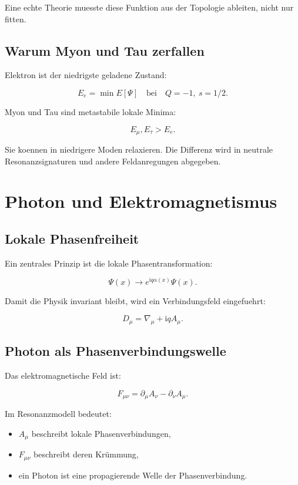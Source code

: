 \documentclass[11pt,a4paper]{article}
\newcommand{\ii}{\mathrm{i}}
\begin{document}
Eine echte Theorie muesste diese Funktion aus der Topologie ableiten, nicht nur fitten.

\subsection{Warum Myon und Tau zerfallen}

Elektron ist der niedrigste geladene Zustand:

\[
E_e = \min E[\Psi]\quad\text{bei}\quad Q=-1,\ s=1/2.
\]

Myon und Tau sind metastabile lokale Minima:

\[
E_\mu,E_\tau > E_e.
\]

Sie koennen in niedrigere Moden relaxieren. Die Differenz wird in neutrale Resonanzsignaturen und andere
Feldanregungen abgegeben.

\section{Photon und Elektromagnetismus}

\subsection{Lokale Phasenfreiheit}

Ein zentrales Prinzip ist die lokale Phasentransformation:

\[
\Psi(x)\rightarrow e^{\ii q\alpha(x)}\Psi(x).
\]

Damit die Physik invariant bleibt, wird ein Verbindungsfeld eingefuehrt:

\[
D_\mu = \nabla_\mu + \ii q A_\mu.
\]

\subsection{Photon als Phasenverbindungswelle}

Das elektromagnetische Feld ist:

\[
F_{\mu\nu}=\partial_\mu A_\nu-\partial_\nu A_\mu.
\]

Im Resonanzmodell bedeutet:
\begin{itemize}
  \item $A_\mu$ beschreibt lokale Phasenverbindungen,
  \item $F_{\mu\nu}$ beschreibt deren Krümmung,
  \item ein Photon ist eine propagierende Welle der Phasenverbindung.
\end{itemize}
\end{document}
